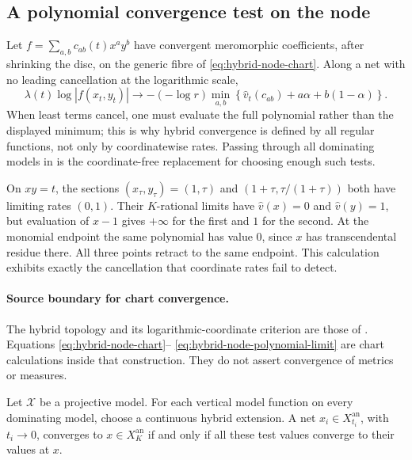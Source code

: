 \subsection{A polynomial convergence test on the node}
\label{sec:hybrid-node-polynomial-test}

Let
$f=\sum_{a,b}c_{ab}(t)x^ay^b$ have convergent meromorphic coefficients,
after shrinking the disc, on the generic fibre of \eqref{eq:hybrid-node-chart}.  Along a net with no leading cancellation at the logarithmic scale,
\[
 \lambda(t)\log|f(x_t,y_t)|
 \longrightarrow
 -(-\log r)\min_{a,b}
 \left\{\widehat v_t(c_{ab})+a\alpha+b(1-\alpha)\right\}.
\tag{66.15}\label{eq:hybrid-node-polynomial-limit}
\]
When least terms cancel, one must evaluate the full polynomial rather than
the displayed minimum; this is why hybrid convergence is defined by all
regular functions, not only by coordinatewise rates.  Passing through all
dominating models in  is the
coordinate-free replacement for choosing enough such tests.

\begin{example}
\label{ex:hybrid-node-cancellation}
On $xy=t$, the sections $(x_\tau,y_\tau)=(1,\tau)$ and $(1+\tau,\tau/(1+\tau))$ both have limiting rates $(0,1)$. Their $K$-rational limits have $\widehat v(x)=0$ and $\widehat v(y)=1$, but evaluation of $x-1$ gives $+\infty$ for the first and $1$ for the second. At the monomial endpoint the same polynomial has value $0$, since $x$ has transcendental residue there. All three points retract to the same endpoint. This calculation exhibits exactly the cancellation that coordinate rates fail to detect.
\end{example}

\paragraph{Source boundary for chart convergence.}
The hybrid topology and its logarithmic-coordinate criterion are those of
\cite{BJ17Hybrid}.  Equations \eqref{eq:hybrid-node-chart}--
\eqref{eq:hybrid-node-polynomial-limit} are chart calculations inside that
construction.  They do not assert convergence of metrics or measures.

\begin{proposition}\label{prop:hybrid-model-criterion}
Let $\mathcal X$ be a projective model. For each vertical model function on every dominating model, choose a continuous hybrid extension. A net $x_i\in X_{t_i}^{\mathrm{an}}$, with $t_i\to0$, converges to $x\in X_K^{\mathrm{an}}$ if and only if all these test values converge to their values at $x$.
\end{proposition}


